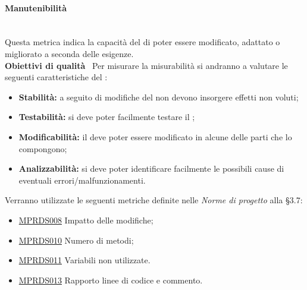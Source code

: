 \paragraph{Manutenibilità}\mbox{}\\[0.4cm]
Questa metrica indica la capacità del  di poter essere modificato, adattato o migliorato a seconda delle esigenze.\\[0.4cm]
\textbf{Obiettivi di qualità} \ Per misurare la misurabilità si andranno a valutare le seguenti caratteristiche del :
\begin{itemize}
	\item \textbf{Stabilità:} a seguito di modifiche del  non devono insorgere effetti non voluti;
	\item \textbf{Testabilità:} si deve poter facilmente testare il ;
	\item \textbf{Modificabilità:} il  deve poter essere modificato in alcune delle parti che lo compongono;
	\item \textbf{Analizzabilità:} si deve poter identificare facilmente le possibili cause di eventuali errori/malfunzionamenti.
\end{itemize}
Verranno utilizzate le seguenti metriche definite nelle \textit{Norme di progetto} alla §3.7:
\begin{itemize}
	\item \hyperref[sec:qualita_software]{MPRDS008} Impatto delle modifiche;
	\item \hyperref[sec:qualita_software]{MPRDS010} Numero di metodi;
	\item \hyperref[sec:qualita_software]{MPRDS011} Variabili non utilizzate.
	\item \hyperref[sec:qualita_software]{MPRDS013} Rapporto linee di codice e commento.
\end{itemize}
\clearpage

